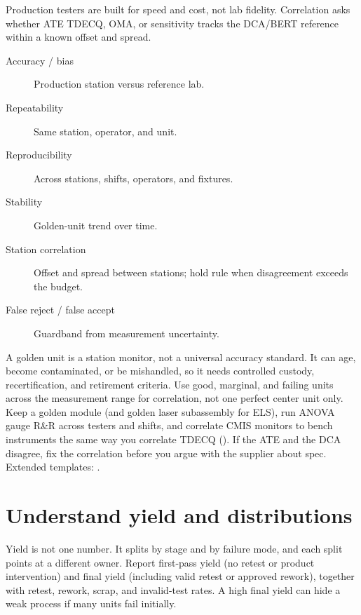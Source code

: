 Production testers are built for speed and cost, not lab fidelity. Correlation
asks whether ATE TDECQ, OMA, or sensitivity tracks the DCA/BERT reference
within a known offset and spread.

\begin{description}
\item[Accuracy / bias] Production station versus reference lab.
\item[Repeatability] Same station, operator, and unit.
\item[Reproducibility] Across stations, shifts, operators, and fixtures.
\item[Stability] Golden-unit trend over time.
\item[Station correlation] Offset and spread between stations; hold rule when
      disagreement exceeds the budget.
\item[False reject / false accept] Guardband from measurement uncertainty.
\end{description}

A golden unit is a station monitor, not a universal accuracy standard. It can
age, become contaminated, or be mishandled, so it needs controlled custody,
recertification, and retirement criteria. Use good, marginal, and failing units
across the measurement range for correlation, not one perfect center unit only.
Keep a golden module (and golden laser subassembly for ELS), run ANOVA gauge
R\&R across testers and shifts, and correlate CMIS monitors to bench instruments
the same way you correlate TDECQ (). If the ATE and the DCA
disagree, fix the correlation before you argue with the supplier about spec.
Extended templates: .



\section{Understand yield and distributions}
\label{sec:yield-analysis}

Yield is not one number. It splits by stage and by failure mode, and each split
points at a different owner. Report first-pass yield (no retest or product
intervention) and final yield (including valid retest or approved rework),
together with retest, rework, scrap, and invalid-test rates. A high final yield
can hide a weak process if many units fail initially.

